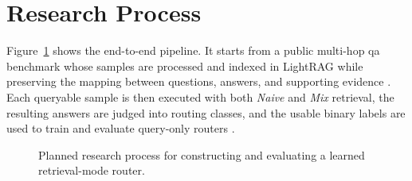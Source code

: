 \documentclass[english, bibtex]{kththesis}               %
\numberwithin{listing}{chapter}
\begin{document}
\section{Research Process}
\label{sec:researchProcess}

Figure~\ref{fig:methodPipeline} shows the end-to-end pipeline. It starts from a public multi-hop \gls{qa} benchmark whose samples are processed and indexed in LightRAG while preserving the mapping between questions, answers, and supporting evidence \cite{ho2020twowiki,lightrag2024}. Each queryable sample is then executed with both \emph{Naive} and \emph{Mix} retrieval, the resulting answers are judged into routing classes, and the usable binary labels are used to train and evaluate query-only routers \cite{zheng2023judge}.

\begin{figure}[!ht]
\centering
{}
\caption{Planned research process for constructing and evaluating a learned retrieval-mode router.}
\label{fig:methodPipeline}
\end{figure}
\end{document}
